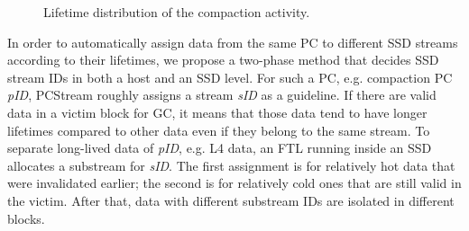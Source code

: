 \begin{figure}[!t]
\centering
\vspace{-7pt}
\hspace{2pt}
\hfill
\vspace{-10pt}
\vspace{-5pt}
\caption{Lifetime distribution of the compaction activity.} %
\label{fig:compaction}
\vspace{-15pt}
\end{figure}

In order to automatically assign data from the same PC to different SSD streams
according to their lifetimes, we propose a two-phase method that decides SSD
stream IDs in both a host and an SSD level.  
For such a PC, e.g. compaction PC {\it pID}, {\sf PCStream} roughly assigns a
stream {\it sID} as a guideline.
If there are valid data in a victim block for GC, it means
that those data tend to have longer lifetimes compared to other data even if
they belong to the same stream.
To separate long-lived data of {\it pID}, e.g. L4 data, 
an FTL running inside an SSD allocates a substream for {\it sID}.
The first assignment is for relatively hot data that were invalidated
earlier; the second is for relatively cold ones that are still valid in the
victim.  After that, data with different substream IDs are isolated in
different blocks. 

